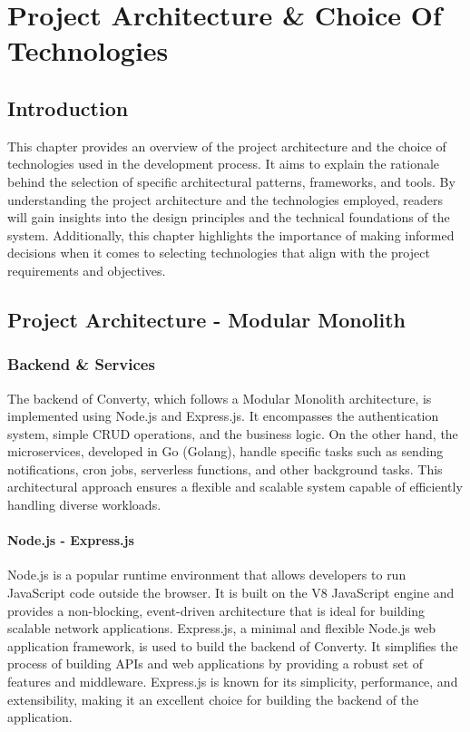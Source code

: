 \chapter{Project Architecture \& Choice Of Technologies}

\section{Introduction}
This chapter provides an overview of the project architecture and the choice of technologies used in the development process. It aims to explain the rationale behind the selection of specific architectural patterns, frameworks, and tools. By understanding the project architecture and the technologies employed, readers will gain insights into the design principles and the technical foundations of the system. Additionally, this chapter highlights the importance of making informed decisions when it comes to selecting technologies that align with the project requirements and objectives.

\section{Project Architecture - Modular Monolith}

\subsection{Backend \& Services}
The backend of Converty, which follows a Modular Monolith architecture, is implemented using Node.js and Express.js. It encompasses the authentication system, simple CRUD operations, and the business logic. On the other hand, the microservices, developed in Go (Golang), handle specific tasks such as sending notifications, cron jobs, serverless functions, and other background tasks. This architectural approach ensures a flexible and scalable system capable of efficiently handling diverse workloads.

\subsubsection{Node.js - Express.js}
Node.js is a popular runtime environment that allows developers to run JavaScript code outside the browser. It is built on the V8 JavaScript engine and provides a non-blocking, event-driven architecture that is ideal for building scalable network applications. Express.js, a minimal and flexible Node.js web application framework, is used to build the backend of Converty. It simplifies the process of building APIs and web applications by providing a robust set of features and middleware. Express.js is known for its simplicity, performance, and extensibility, making it an excellent choice for building the backend of the application.

